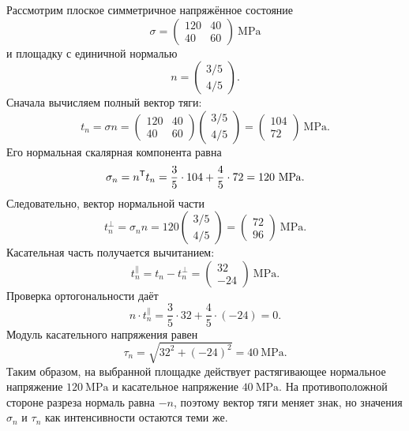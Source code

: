 Рассмотрим плоское симметричное напряжённое состояние
\begin{equation}
\label{eq:worked-stress-tensor-v02}
\sigma=
\begin{pmatrix}
120&40\\
40&60
\end{pmatrix}\ \mathrm{MPa}
\end{equation}
и площадку с единичной нормалью
\begin{equation}
\label{eq:worked-normal-v02}
n=
\begin{pmatrix}
3/5\\
4/5
\end{pmatrix}.
\end{equation}
Сначала вычисляем полный вектор тяги:
\begin{equation}
\label{eq:worked-traction-v02}
t_n=\sigma n
=
\begin{pmatrix}
120&40\\
40&60
\end{pmatrix}
\begin{pmatrix}
3/5\\
4/5
\end{pmatrix}
=
\begin{pmatrix}
104\\
72
\end{pmatrix}\ \mathrm{MPa}.
\end{equation}
Его нормальная скалярная компонента равна
\begin{equation}
\label{eq:worked-normal-stress-v02}
\sigma_n
=n^{\mathsf{T}}t_n
=
\frac35\cdot104+
\frac45\cdot72
=120\ \mathrm{MPa}.
\end{equation}
Следовательно, вектор нормальной части
\begin{equation}
\label{eq:worked-normal-vector-v02}
t_n^{\perp}=\sigma_n n
=
120
\begin{pmatrix}
3/5\\
4/5
\end{pmatrix}
=
\begin{pmatrix}
72\\
96
\end{pmatrix}\ \mathrm{MPa}.
\end{equation}
Касательная часть получается вычитанием:
\begin{equation}
\label{eq:worked-shear-vector-v02}
t_n^{\parallel}
=t_n-t_n^{\perp}
=
\begin{pmatrix}
32\\
-24
\end{pmatrix}\ \mathrm{MPa}.
\end{equation}
Проверка ортогональности даёт
\[
n\cdot t_n^{\parallel}
=
\frac35\cdot32+
\frac45\cdot(-24)=0.
\]
Модуль касательного напряжения равен
\begin{equation}
\label{eq:worked-shear-magnitude-v02}
\tau_n
=
\sqrt{32^2+(-24)^2}
=40\ \mathrm{MPa}.
\end{equation}
Таким образом, на выбранной площадке действует растягивающее нормальное напряжение $120\ \mathrm{MPa}$ и касательное напряжение $40\ \mathrm{MPa}$. На противоположной стороне разреза нормаль равна $-n$, поэтому вектор тяги меняет знак, но значения $\sigma_n$ и $\tau_n$ как интенсивности остаются теми же.

